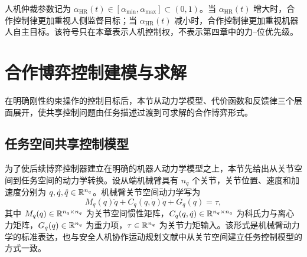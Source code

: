 \begin{definition}[人机仲裁参数]
\label{def:ch3_alpha_hr}
人机仲裁参数记为 $\alpha_{\mathrm{HR}}(t)\in[\alpha_{\min},\alpha_{\max}]\subset(0,1)$。当 $\alpha_{\mathrm{HR}}(t)$ 增大时，合作控制律更加重视人侧监督目标；当 $\alpha_{\mathrm{HR}}(t)$ 减小时，合作控制律更加重视机器人自主目标。该符号只在本章表示人机控制权，不表示第四章中的力--位优先级。
\end{definition}


\section{合作博弈控制建模与求解}
\label{sec:ch3_game_controller}

在明确刚性约束操作的控制目标后，本节从动力学模型、代价函数和反馈律三个层面展开，使共享控制问题由任务描述过渡到可求解的合作博弈形式。

\subsection{任务空间共享控制模型}
\label{subsec:ch3_manipulator_dynamics}

为了使后续博弈控制器建立在明确的机器人动力学模型之上，本节先给出从关节空间到任务空间的动力学转换。设从端机械臂具有 $n_q$ 个关节，关节位置、速度和加速度分别为 $q,\dot q,\ddot q\in\mathbb{R}^{n_q}$。机械臂关节空间动力学写为
\begin{equation}
  M_q(q)\ddot q+C_q(q,\dot q)\dot q+G_q(q)=\tau,
  \label{eq:ch3_joint_dynamics}
\end{equation}
其中 $M_q(q)\in\mathbb{R}^{n_q\times n_q}$ 为关节空间惯性矩阵，$C_q(q,\dot q)\in\mathbb{R}^{n_q\times n_q}$ 为科氏力与离心力矩阵，$G_q(q)\in\mathbb{R}^{n_q}$ 为重力项，$\tau\in\mathbb{R}^{n_q}$ 为关节力矩输入。该形式是机械臂动力学的标准表达，也与安全人机协作运动规划文献中从关节空间建立任务控制模型的方式一致\cite{li2025optimal}。

